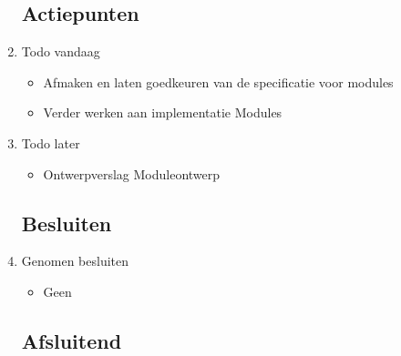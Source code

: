 \documentclass{article}
\begin{document}
\begin{enumerate}
	\subsection*{Actiepunten}
	\item Todo vandaag
	\begin{itemize}
		\item	Afmaken en laten goedkeuren van de specificatie voor modules
		\item	Verder werken aan implementatie Modules
		
	\end{itemize}
	\item Todo later
	\begin{itemize}
		\item	Ontwerpverslag Moduleontwerp
	\end{itemize}

	\subsection*{Besluiten}
	\item Genomen besluiten
	\begin{itemize}
		\item Geen
	\end{itemize}

	\noindent 
	\subsection*{Afsluitend}
	\0%

\end{enumerate}
\end{document}
